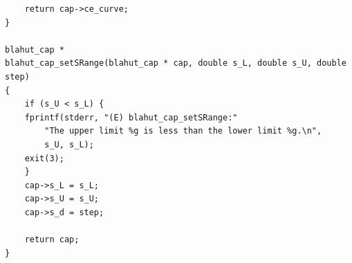 \documentclass[a4paper,10pt]{article}
\begin{document}
\begin{verbatim}
    return cap->ce_curve;
}

blahut_cap * 
blahut_cap_setSRange(blahut_cap * cap, double s_L, double s_U, double step)
{
    if (s_U < s_L) {
	fprintf(stderr, "(E) blahut_cap_setSRange:" 
		"The upper limit %g is less than the lower limit %g.\n",
		s_U, s_L);
	exit(3);
    }
    cap->s_L = s_L;
    cap->s_U = s_U;
    cap->s_d = step;

    return cap;
}
\end{verbatim}
 
\end{document}
